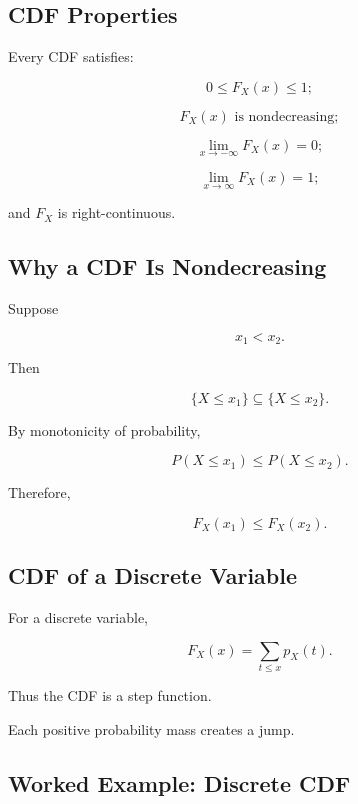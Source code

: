 \subsection{CDF Properties}
\label{subsec:cdf-properties}

Every CDF satisfies:

\[
\boxed{
0\leq F_X(x)\leq1;
}
\]

\[
\boxed{
F_X(x)
\text{ is nondecreasing};
}
\]

\[
\boxed{
\lim_{x\to-\infty}F_X(x)=0;
}
\]

\[
\boxed{
\lim_{x\to\infty}F_X(x)=1;
}
\]

and \(F_X\) is right-continuous.

\subsection{Why a CDF Is Nondecreasing}
\label{subsec:cdf-nondecreasing}

Suppose

\[
x_1<x_2.
\]

Then

\[
\{X\leq x_1\}
\subseteq
\{X\leq x_2\}.
\]

By monotonicity of probability,

\[
P(X\leq x_1)
\leq
P(X\leq x_2).
\]

Therefore,

\[
\boxed{
F_X(x_1)\leq F_X(x_2).
}
\]

\subsection{CDF of a Discrete Variable}
\label{subsec:cdf-discrete-variable}

For a discrete variable,

\[
\boxed{
F_X(x)
=
\sum_{t\leq x}p_X(t).
}
\]

Thus the CDF is a step function.

Each positive probability mass creates a jump.

\subsection{Worked Example: Discrete CDF}
\label{subsec:worked-discrete-cdf}

